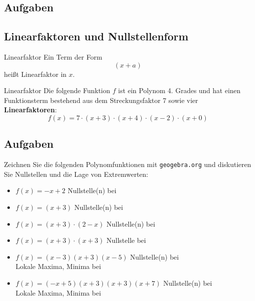 \subsection*{Aufgaben}

\newpage



\subsection{Linearfaktoren und Nullstellenform}
\begin{definition}{Linearfaktor}{}
  Ein Term der Form
  $$(x+a)$$
  heißt Linearfaktor in $x$.
\end{definition}

\begin{beispiel}{Linearfaktor}{}
  Die folgende Funktion $f$ ist ein Polynom 4. Grades und hat einen
  Funktionsterm bestehend aus dem Streckungsfaktor 7 sowie vier \textbf{Linearfaktoren}:
  $$f(x) = 7\cdot{}(x+3)\cdot{}(x+4)\cdot{}(x-2)\cdot{}(x+0)$$
\end{beispiel}



\subsection*{Aufgaben}

Zeichnen Sie die folgenden Polynomfunktionen mit \texttt{geogebra.org}
und diskutieren Sie Nullstellen und die Lage von Extremwerten:

\begin{itemize}
\item $f(x) = -x + 2 $ Nullstelle(n) bei  
\item $f(x) = (x+3)$ Nullstelle(n) bei 
\item $f(x) = (x+3)\cdot{}(2-x)$ Nullstelle(n) bei
\item $f(x) = (x+3)\cdot{}(x+3)$ 
  Nullstelle bei 
\item $f(x) = (x-3)(x+3)(x-5)$ Nullstelle(n) bei \\
  Lokale Maxima, Minima bei 
\item $f(x) = (-x+5)(x+3)(x+3)(x+7)$ Nullstelle(n) bei
  \\
  Lokale Maxima, Minima bei 
\end{itemize} 




\newpage

